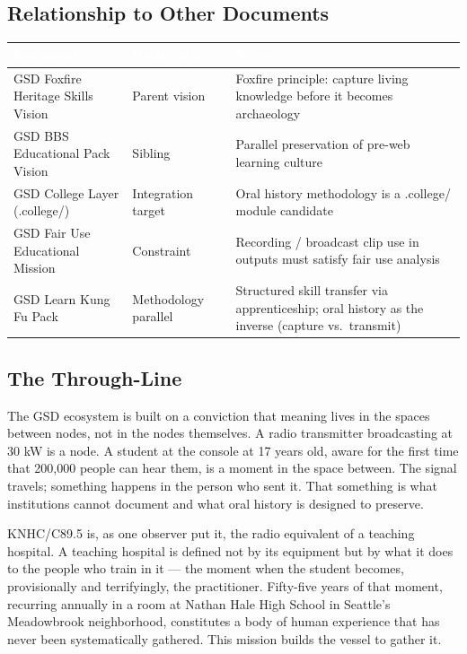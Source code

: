 \documentclass[11pt,letterpaper]{article}
\newcommand{\tableheader}[1]{\textbf{\sffamily\textcolor{white}{#1}}}
\begin{document}
\subsection{Relationship to Other Documents}

\begin{center}
\begin{tabularx}{\textwidth}{L{4.5cm}L{4cm}X}
\toprule
{}
\tableheader{Document} & \tableheader{Relationship} & \tableheader{Notes} \\
\midrule
GSD Foxfire Heritage Skills Vision & Parent vision & Foxfire principle: capture living knowledge before it becomes archaeology \\
GSD BBS Educational Pack Vision & Sibling & Parallel preservation of pre-web learning culture \\
GSD College Layer (.college/) & Integration target & Oral history methodology is a .college/ module candidate \\
GSD Fair Use Educational Mission & Constraint & Recording / broadcast clip use in outputs must satisfy fair use analysis \\
GSD Learn Kung Fu Pack & Methodology parallel & Structured skill transfer via apprenticeship; oral history as the inverse (capture vs.\ transmit) \\
\bottomrule
\end{tabularx}
\end{center}

\subsection{The Through-Line}

The GSD ecosystem is built on a conviction that meaning lives in the spaces between nodes, not in the nodes themselves. A radio transmitter broadcasting at 30 kW is a node. A student at the console at 17 years old, aware for the first time that 200,000 people can hear them, is a moment in the space between. The signal travels; something happens in the person who sent it. That something is what institutions cannot document and what oral history is designed to preserve.

KNHC/C89.5 is, as one observer put it, the radio equivalent of a teaching hospital. A teaching hospital is defined not by its equipment but by what it does to the people who train in it --- the moment when the student becomes, provisionally and terrifyingly, the practitioner. Fifty-five years of that moment, recurring annually in a room at Nathan Hale High School in Seattle's Meadowbrook neighborhood, constitutes a body of human experience that has never been systematically gathered. This mission builds the vessel to gather it.
\end{document}
